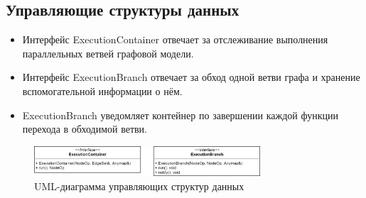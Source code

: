 \subsection{Управляющие структуры данных}
\begin{frame}
    \begin{itemize}
        \item Интерфейс ExecutionContainer отвечает за отслеживание выполнения параллельных ветвей графовой модели.
        \item Интерфейс ExecutionBranch отвечает за обход одной ветви графа и хранение вспомогательной информации о нём.
        \item ExecutionBranch уведомляет контейнер по завершении каждой функции перехода в обходимой ветви.
    \end{itemize}

    \begin{figure}
        \centering
        \includegraphics[width=0.75\textwidth]{images/UML.all.png}
        \caption{UML-диаграмма управляющих структур данных}
    \end{figure}


\end{frame}
